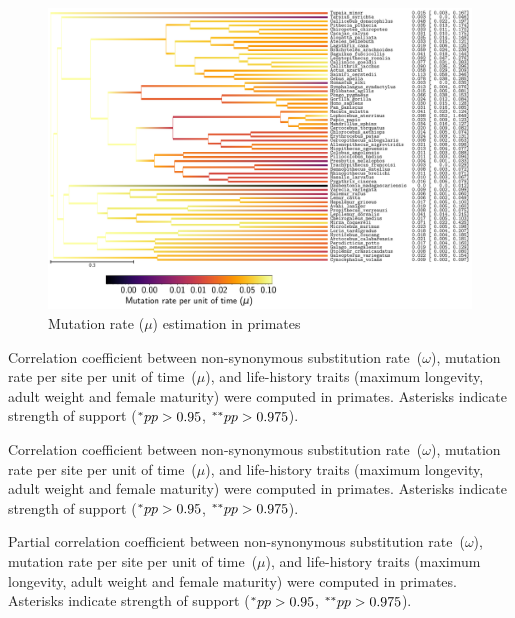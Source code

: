 \documentclass{article}
\begin{document}
	\begin{figure}[H]
		\centering
		\includegraphics[width=\linewidth, page=1]{primates/BranchOmega_LogMutationRatePerTime}
		\caption[$\mu$ estimation in primates]{Mutation rate ($\mu$) estimation in primates}
	\end{figure}

	\begin{table}[H]
		
		\caption[Correlation coefficient matrix in primates ($\omega$)]{
		Correlation coefficient between {non-synonymous} {substitution} rate~($\omega$), mutation rate per site per unit of time~($\mu$), and life-history traits (maximum longevity, adult weight and female maturity) were computed in primates.
		Asterisks indicate strength of support ($\smash{^{*}} pp > 0.95$, $\smash{^{**}} pp > 0.975$).}
	\end{table}

	\begin{table}[H]
		
		\caption[Covariance matrix in primates ($\omega$)]{
		Correlation coefficient between {non-synonymous} {substitution} rate~($\omega$), mutation rate per site per unit of time~($\mu$), and life-history traits (maximum longevity, adult weight and female maturity) were computed in primates.
		Asterisks indicate strength of support ($\smash{^{*}} pp > 0.95$, $\smash{^{**}} pp > 0.975$).}
	\end{table}

	\begin{table}[H]
		
		\caption[Partial correlation coefficient matrix in primates ($\omega$)]{
		Partial correlation coefficient between {non-synonymous} {substitution} rate~($\omega$), mutation rate per site per unit of time~($\mu$), and life-history traits (maximum longevity, adult weight and female maturity) were computed in primates.
		Asterisks indicate strength of support ($\smash{^{*}} pp > 0.95$, $\smash{^{**}} pp > 0.975$).}
	\end{table}
\end{document}
